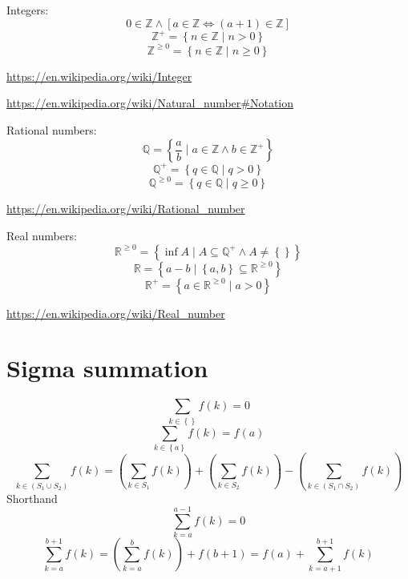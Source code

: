 \documentclass[]{article}
\newcommand{\pqty}[1]{{\left(#1\right)}}
\newcommand{\Bqty}[1]{{\left\{#1\right\}}}
\newcommand{\bqty}[1]{{\left[#1\right]}}
\numberwithin{equation}{section}
\begin{document}
	Integers:
	\begin{equation}
	0\in\mathbb{Z}\land\bqty{a\in\mathbb{Z}\Leftrightarrow \pqty{a+1}\in\mathbb{Z}}
	\end{equation}
	\begin{equation}
	\mathbb{Z}^+=\Bqty{n\in\mathbb{Z}\mid n>0}
	\end{equation}
	\begin{equation}
	\mathbb{Z}^{\geq 0}=\Bqty{n\in\mathbb{Z}\mid n\geq 0}
	\end{equation}
	
	\url{https://en.wikipedia.org/wiki/Integer}
	
	\url{https://en.wikipedia.org/wiki/Natural_number#Notation}
	
	Rational numbers:
	\begin{equation}
	\mathbb{Q}=\Bqty{\frac{a}{b}\mid a\in\mathbb{Z}\land b\in\mathbb{Z}^+}
	\end{equation}
	\begin{equation}
	\mathbb{Q}^+=\Bqty{q\in\mathbb{Q}\mid q>0}
	\end{equation}
	\begin{equation}
	\mathbb{Q}^{\geq 0}=\Bqty{q\in\mathbb{Q}\mid q\geq 0}
	\end{equation}
	
	\url{https://en.wikipedia.org/wiki/Rational_number}
	
	Real numbers:
	\begin{equation}
	\mathbb{R}^{\geq 0}=\Bqty{\inf A\mid A\subseteq\mathbb{Q}^+\land A\neq \Bqty{}}
	\end{equation}
	\begin{equation}
	\mathbb{R}=\Bqty{a-b\mid \Bqty{a,b}\subseteq\mathbb{R}^{\geq 0}}
	\end{equation}
	\begin{equation}
	\mathbb{R}^+=\Bqty{a\in\mathbb{R}^{\geq 0}\mid a>0}
	\end{equation}
	
	\url{https://en.wikipedia.org/wiki/Real_number}
	
	\section{Sigma summation}
	\begin{equation}
	\sum_{k\in\Bqty{}}f\pqty{k}=0
	\end{equation}
	\begin{equation}
	\sum_{k\in\Bqty{a}}f\pqty{k}=f\pqty{a}
	\end{equation}
	\begin{equation}
	\sum_{k\in\pqty{S_1\cup S_2}}f\pqty{k}
	=
	\pqty{\sum_{k\in{S_1}}f\pqty{k}}
	+
	\pqty{\sum_{k\in{S_2}}f\pqty{k}}
	-
	\pqty{\sum_{k\in\pqty{S_1\cap S_2}}f\pqty{k}}
	\end{equation}
	Shorthand
	\begin{equation}
	\sum_{k={a}}^{a-1} f\pqty{k}=0
	\end{equation}
	\begin{equation}
	\sum_{k={a}}^{b+1} f\pqty{k}=
	\pqty{\sum_{k={a}}^{b} f\pqty{k}}+f\pqty{b+1}=
	f\pqty{a}+{\sum_{k={a+1}}^{b+1} f\pqty{k}}
	\end{equation}
	
\end{document}
